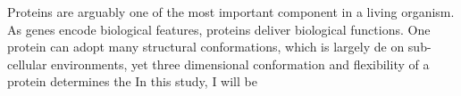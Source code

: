 Proteins are arguably one of the most important component in a living organism. As genes encode biological features, proteins deliver biological functions. One protein can adopt many structural conformations, which is largely de on sub-cellular environments, yet three dimensional conformation and flexibility of a protein determines the     In this study, I will be 